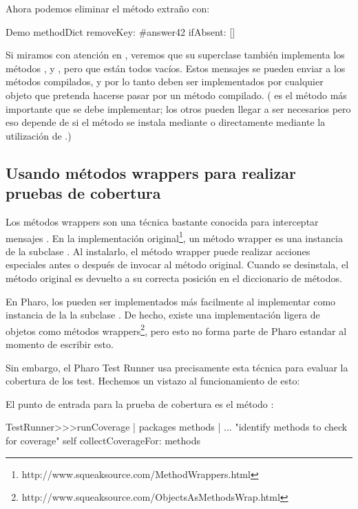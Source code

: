 \documentclass[a4paper,10pt,twoside]{book}
\begin{document}
Ahora podemos eliminar el método extraño con:
\begin{code}{}
Demo methodDict removeKey: #answer42 ifAbsent: []
\end{code}

Si miramos con atención en , veremos que
su superclase también implementa los métodos ,
 y , pero que están todos vacíos.
Estos mensajes se pueden enviar a los métodos compilados, y por lo
tanto deben ser implementados por cualquier objeto que pretenda
hacerse pasar por un método compilado.  ( es el método
más importante que se debe implementar; los otros pueden llegar a ser
necesarios pero eso depende de si el método se instala mediante
 o directamente mediante
la utilización de .)


\subsection{Usando m\'etodos wrappers para realizar pruebas de cobertura}

Los m\'etodos wrappers son una t\'ecnica bastante conocida para interceptar mensajes \cite{Bran98a}. En la implementaci\'on original\footnote{http://www.squeaksource.com/MethodWrappers.html}, un m\'etodo wrapper es una instancia de la subclase . Al instalarlo, el m\'etodo wrapper puede realizar acciones especiales antes o despu\'es de invocar al m\'etodo original. Cuando se desinstala, el m\'etodo original es devuelto a su correcta posici\'on en el diccionario de m\'etodos.

En Pharo, los  pueden ser implementados m\'as facilmente al implementar  como instancia de la la subclase . De hecho, existe una implementaci\'on ligera de objetos como m\'etodos wrappers\footnote{http://www.squeaksource.com/ObjectsAsMethodsWrap.html}, pero esto no forma parte de Pharo estandar al momento de escribir esto.

Sin embargo, el Pharo Test Runner usa precisamente esta técnica para evaluar la cobertura de los test. Hechemos un vistazo al funcionamiento de esto:

El punto de entrada para la prueba de cobertura es el m\'etodo :
\begin{code}{}
TestRunner>>>runCoverage
        | packages methods |
        ... "identify methods to check for coverage"
        self collectCoverageFor: methods
\end{code}
\end{document}
